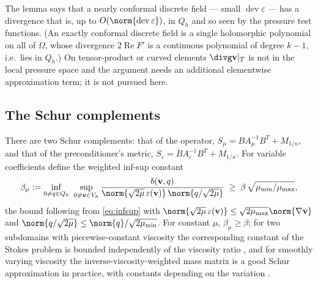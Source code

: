 \documentclass[11pt]{article}
\numberwithin{equation}{section}
\theoremstyle{remark}
\newcommand{\eps}{\varepsilon}
\newcommand{\dev}{\operatorname{dev}}
\newcommand{\vv}{\mathbf{v}}
\newcommand{\Ae}{A_{\eps}}
\newcommand{\Amu}{A_{\mu}}
\newcommand{\Mk}{M_{1/\kappa}}
\newcommand{\Vh}{V_h}
\newcommand{\Qh}{Q_h}
\begin{document}
The lemma says that a nearly conformal discrete field --- small
$\dev\eps$ --- has a divergence that is, up to $O(\norm{\dev\eps})$, in
$\Qh$ and so seen by the pressure test functions. (An exactly conformal
discrete field is a single holomorphic polynomial on all of $\Omega$, whose
divergence $2\operatorname{Re}F'$ is a continuous polynomial of degree
$k-1$, i.e.\ lies in $\Qh$.) On tensor-product or curved elements
$\divg\vv|_T$ is not in the local pressure space and the argument needs an
additional elementwise approximation term; it is not pursued here.

\subsection{The Schur complements}
\label{sec:schur}

There are two Schur complements: that of the operator,
$S_\mu = B\Amu^{-1}B^T + \Mk$, and that of the preconditioner's metric,
$S_\eps = B\Ae^{-1}B^T + \Mk$. For variable coefficients define the
weighted inf-sup constant
\begin{equation}
  \beta_\mu := \inf_{0\ne q\in\Qh}\ \sup_{0\ne\vv\in\Vh}
  \frac{b(\vv,q)}{\norm{\sqrt{2\mu}\,\eps(\vv)}\,
  \norm{q/\sqrt{2\mu}}} \;\ge\;\beta\,\sqrt{\mu_{\min}/\mu_{\max}},
\end{equation}
the bound following from \eqref{eq:infsup} with
$\norm{\sqrt{2\mu}\,\eps(\vv)}\le\sqrt{2\mu_{\max}}\norm{\nabla\vv}$ and
$\norm{q/\sqrt{2\mu}}\le\norm{q}/\sqrt{2\mu_{\min}}$. For constant $\mu$,
$\beta_\mu\ge\beta$; for two subdomains with piecewise-constant viscosity
the corresponding constant of the Stokes problem is bounded independently
of the viscosity ratio \cite{OlshanskiiReusken2006}, and for smoothly
varying viscosity the inverse-viscosity-weighted mass matrix is a good
Schur approximation in practice, with constants depending on the
variation \cite{GrinevichOlshanskii2009}.
\end{document}
